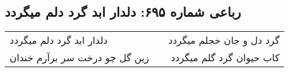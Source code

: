 \begin{center}
\section*{رباعی شماره ۶۹۵: دلدار ابد گرد دلم میگردد}
\label{sec:0695}
\begin{longtable}{l p{0.5cm} r}
دلدار ابد گرد دلم میگردد
&&
گرد دل و جان خجلم میگردد
\\
زین گل چو درخت سر برآرم خندان
&&
کاب حیوان گرد گلم میگردد
\\
\end{longtable}
\end{center}

